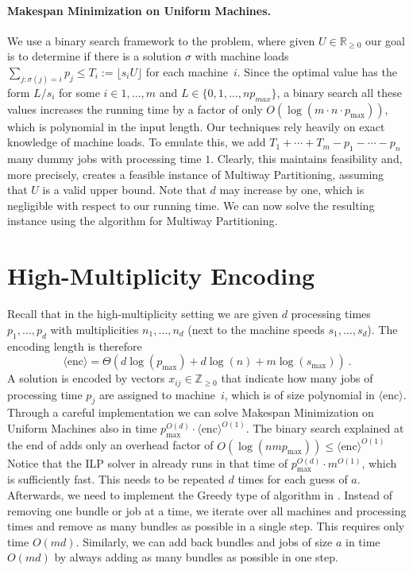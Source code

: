 \documentclass{article}
\newcommand{\Z}{\mathbb{Z}}
\newcommand{\ZZ}{\Z_{\ge 0}}
\newcommand{\R}{\mathbb{R}}
\newcommand{\RR}{\R_{\ge 0}}
\begin{document}
\paragraph{Makespan Minimization on Uniform Machines.}
We use a binary search framework to the problem, where given $U\in\RR$
our goal is to determine if there is a solution $\sigma$ with
machine loads $\sum_{j : \sigma(j) = i} p_j \le T_i := \lfloor s_i U \rfloor$ for each machine~$i$.
Since the optimal value has the form $L / s_i$ for some $i\in{1,\dotsc,m}$ and $L\in\{0,1,\dotsc,n p_{max}\}$,
a binary search all these values increases the running time by a factor of only 
$O(\log(m \cdot n \cdot p_{\max}))$, which is
polynomial in the input length.
Our techniques rely heavily on exact knowledge of machine loads. To emulate this,
we add $T_1 + \cdots + T_m - p_1 - \cdots - p_n$ many dummy jobs 
with processing time $1$. Clearly, this maintains feasibility and, more precisely,
creates a feasible instance of Multiway Partitioning, assuming that $U$ is a valid upper bound.
Note that $d$ may increase by one, which is negligible with respect to our running time.
We can now solve the resulting instance using the algorithm for Multiway Partitioning.

\section{High-Multiplicity Encoding}
\label{sec:high-mult}
Recall that in the high-multiplicity setting we are given $d$ processing times $p_1,\dotsc,p_d$
with multiplicities $n_1,\dotsc,n_d$ (next to the machine speeds $s_1,\dotsc,s_d$). The encoding length
is therefore
\begin{equation*}
	\langle \mathrm{enc} \rangle = \Theta(d \log(p_{\max}) + d\log(n) + m \log(s_{\max})) \ .
\end{equation*}
A solution is encoded by vectors $x_{ij} \in \ZZ$ that indicate how many jobs of processing time $p_j$
are assigned to machine~$i$, which is of size polynomial in $\langle \mathrm{enc} \rangle$.
Through a careful implementation we can solve
Makespan Minimization on Uniform Machines
also in time $p_{\max}^{O(d)} \cdot \langle \mathrm{enc} \rangle^{O(1)}$.
The binary search explained at the end of  adds only an overhead factor
of $O(\log(n m p_{\max})) \le \langle \mathrm{enc} \rangle^{O(1)}$
Notice that the ILP solver in  already runs in that time
of $p_{\max}^{O(d)} \cdot m^{O(1)}$, which is sufficiently fast. This needs to be repeated
$d$ times for each guess of $a$.
Afterwards, we need to implement the Greedy type of algorithm in .
Instead of removing one bundle or job at a time, we iterate over all machines and processing times and
remove as many bundles as possible in a single step.
This requires only time $O(md)$. Similarly, we can add back bundles and jobs
of size $a$ in time $O(md)$ by always adding as many bundles as possible in one step.



\end{document}
